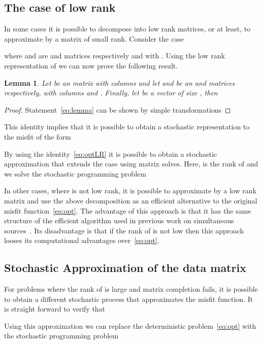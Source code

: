 \documentclass[12pt]{article}
\newtheorem{lem}[thm]{Lemma}
\begin{document}
\subsection{The case of low rank }
\label{meth2}
In some cases it is possible to decompose  into low rank matrices, or at least, to approximate  by a matrix of small rank. Consider the case

where  and  are  and  matrices respectively and with . Using the low rank representation of  we can now prove the following result.
\begin{lem}
Let  be an  matrix with columns  and let  and  be an  and  matrices respectively, with columns  and . Finally, let  be a vector of size , then

\end{lem}
\begin{proof}
Statement~\eqref{eq:lemma} can be shown by simple transformations

\end{proof}


This identity implies that it is possible to obtain a stochastic representation to the misfit of the form

By using the identity~\eqref{eq:optLR} it is possible to obtain a stochastic approximation that extends the case
 using  matrix solves. Here,  is the rank of   and we solve the stochastic programming problem


In other cases, where  is not low rank, it is possible to approximate  by a low rank matrix and use the above decomposition as an efficient alternative to the original misfit function~\eqref{eq:opt}. The advantage of this approach is that it has the same structure of the efficient algorithm used in previous work on simultaneous sources~\cite{HaberChungHerrmann2011}. Its disadvantage is that if the rank of  is not low  then this approach looses its computational advantages over~\eqref{eq:opt}.

\subsection{Stochastic Approximation of the data matrix}
\label{meth3}
For problems where the rank of  is large and matrix completion fails, it is possible to obtain a different stochastic process that approximates the misfit function. It is straight forward to verify that

Using this approximation we can replace the deterministic problem~\eqref{eq:opt} with the stochastic programming problem
\end{document}

